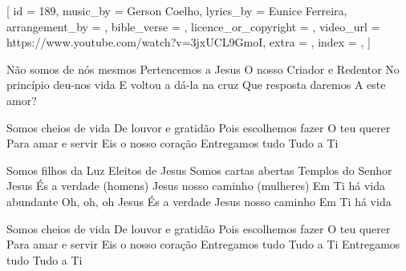 [
    id                     = {189},
    music_by               = {Gerson Coelho},
    lyrics_by              = {Eunice Ferreira},
    arrangement_by         = {},
    bible_verse            = {},
    licence_or_copyright   = {},
    video_url              = {https://www.youtube.com/watch?v=3jxUCL9GmoI},
    extra                  = {},
    index                  = {},
]


\beginverse
Não somos de nós mesmos 
Pertencemos a Jesus
O nosso Criador e Redentor
No princípio deu-nos vida
E voltou a dá-la na cruz
Que resposta daremos
A este amor?
\endverse


\beginchorus
Somos cheios de vida
De louvor e gratidão 
Pois escolhemos fazer 
O teu querer
Para amar e servir
Eis o nosso coração 
Entregamos tudo 
Tudo a Ti
\endchorus


\beginverse
Somos filhos da Luz
Eleitos de Jesus
Somos cartas abertas
Templos do Senhor
Jesus És a verdade (homens) 
Jesus nosso caminho (mulheres)
Em Ti há vida abundante
Oh, oh, oh
Jesus És a verdade
Jesus nosso caminho
Em Ti há vida 
\endverse


\beginchorus
Somos cheios de vida
De louvor e gratidão 
Pois escolhemos fazer 
O teu querer
Para amar e servir
Eis o nosso coração 
Entregamos tudo 
Tudo a Ti
Entregamos tudo 
Tudo a Ti
\endchorus

\endsong
